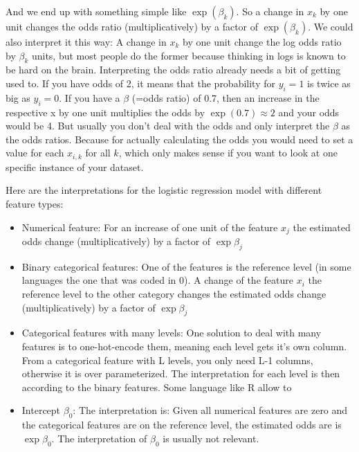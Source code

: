 \documentclass[12pt,]{krantz}
\providecommand{\tightlist}{%
  \setlength{\itemsep}{0pt}\setlength{\parskip}{0pt}}
\theoremstyle{definition}
\theoremstyle{definition}
\theoremstyle{definition}
\theoremstyle{remark}
\begin{document}
And we end up with something simple like \(\exp(\beta_k)\). So a change
in \(x_k\) by one unit changes the odds ratio (multiplicatively) by a
factor of \(\exp(\beta_k)\). We could also interpret it this way: A
change in \(x_k\) by one unit change the log odds ratio by \(\beta_k\)
units, but most people do the former because thinking in logs is known
to be hard on the brain. Interpreting the odds ratio already needs a bit
of getting used to. If you have odds of 2, it means that the probability
for \(y_i = 1\) is twice as big as \(y_i = 0\). If you have a \(\beta\)
(=odds ratio) of \(0.7\), then an increase in the respective x by one
unit multiplies the odds by \(\exp(0.7) \approx 2\) and your odds would
be 4. But usually you don't deal with the odds and only interpret the
\(\beta\) as the odds ratios. Because for actually calculating the odds
you would need to set a value for each \(x_{i,k}\) for all \(k\), which
only makes sense if you want to look at one specific instance of your
dataset.

Here are the interpretations for the logistic regression model with
different feature types:

\begin{itemize}
\tightlist
\item
  Numerical feature: For an increase of one unit of the feature
  \(x_{j}\) the estimated odds change (multiplicatively) by a factor of
  \(\exp{\beta_{j}}\)
\item
  Binary categorical features: One of the features is the reference
  level (in some languages the one that was coded in 0). A change of the
  feature \(x_{i}\) the reference level to the other category changes
  the estimated odds change (multiplicatively) by a factor of
  \(\exp{\beta_{j}}\)
\item
  Categorical features with many levels: One solution to deal with many
  features is to one-hot-encode them, meaning each level gets it's own
  column. From a categorical feature with L levels, you only need L-1
  columns, otherwise it is over parameterized. The interpretation for
  each level is then according to the binary features. Some language
  like R allow to
\item
  Intercept \(\beta_{0}\): The interpretation is: Given all numerical
  features are zero and the categorical features are on the reference
  level, the estimated odds are is \(\exp{\beta_{0}}\). The
  interpretation of \(\beta_{0}\) is usually not relevant.
\end{itemize}
\end{document}
